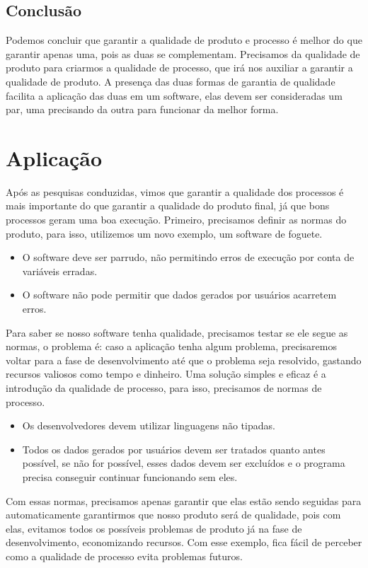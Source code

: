 \documentclass{article}
\begin{document}
\subsection{Conclusão}
Podemos concluir que garantir a qualidade de produto e processo é melhor do que garantir apenas uma, pois as duas se complementam. Precisamos da qualidade de produto para criarmos a qualidade de processo, que irá nos auxiliar a garantir a qualidade de produto. A presença das duas formas de garantia de qualidade facilita a aplicação das duas em um software, elas devem ser consideradas um par, uma precisando da outra para funcionar da melhor forma.

\section{Aplicação}

Após as pesquisas conduzidas, vimos que garantir a qualidade dos processos é mais importante do que garantir a qualidade do produto final, já que bons processos geram uma boa execução. Primeiro, precisamos definir as normas do produto, para isso, utilizemos um novo exemplo, um software de foguete.

\begin{itemize}
  \item O software deve ser parrudo, não permitindo erros de execução por conta de variáveis erradas.
  \item O software não pode permitir que dados gerados por usuários acarretem erros.
\end{itemize}
Para saber se nosso software tenha qualidade, precisamos testar se ele segue as normas, o problema é: caso a aplicação tenha algum problema, precisaremos voltar para a fase de desenvolvimento até que o problema seja resolvido, gastando recursos valiosos como tempo e dinheiro. Uma solução simples e eficaz é a introdução da qualidade de processo, para isso, precisamos de normas de processo.

\begin{itemize}
  \item Os desenvolvedores devem utilizar linguagens não tipadas.
  \item Todos os dados gerados por usuários devem ser tratados quanto antes possível, se não for possível, esses dados devem ser excluídos e o programa precisa conseguir continuar funcionando sem eles.
\end{itemize}
Com essas normas, precisamos apenas garantir que elas estão sendo seguidas para automaticamente garantirmos que nosso produto será de qualidade, pois com elas, evitamos todos os possíveis problemas de produto já na fase de desenvolvimento, economizando recursos. Com esse exemplo, fica fácil de perceber como a qualidade de processo evita problemas futuros.
\end{document}
